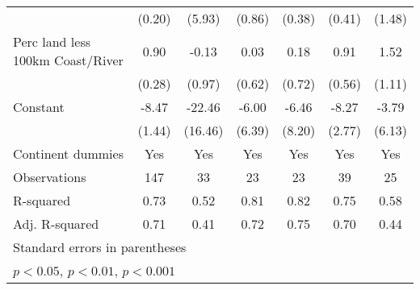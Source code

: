 {\begin{tabular}{l*{6}{c}}
                    &      (0.20)         &      (5.93)         &      (0.86)         &      (0.38)         &      (0.41)         &      (1.48)         \\
\addlinespace
Perc land less 100km Coast/River&        0.90\sym{**} &       -0.13         &        0.03         &        0.18         &        0.91         &        1.52         \\
                    &      (0.28)         &      (0.97)         &      (0.62)         &      (0.72)         &      (0.56)         &      (1.11)         \\
\addlinespace
Constant            &       -8.47\sym{***}&      -22.46         &       -6.00         &       -6.46         &       -8.27\sym{**} &       -3.79         \\
                    &      (1.44)         &     (16.46)         &      (6.39)         &      (8.20)         &      (2.77)         &      (6.13)         \\
\addlinespace
Continent dummies   &         Yes         &         Yes         &         Yes         &         Yes         &         Yes         &         Yes         \\
\midrule
Observations        &         147         &          33         &          23         &          23         &          39         &          25         \\
R-squared           &        0.73         &        0.52         &        0.81         &        0.82         &        0.75         &        0.58         \\
Adj. R-squared      &        0.71         &        0.41         &        0.72         &        0.75         &        0.70         &        0.44         \\
\bottomrule
\multicolumn{7}{l}{\footnotesize Standard errors in parentheses}\\
\multicolumn{7}{l}{\footnotesize \sym{*} \(p<0.05\), \sym{**} \(p<0.01\), \sym{***} \(p<0.001\)}\\
\end{tabular}
}
